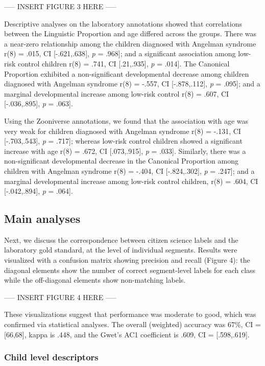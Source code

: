 \documentclass[english,,man]{apa6}
\begin{document}
----- INSERT FIGURE 3 HERE -----

Descriptive analyses on the laboratory annotations showed that correlations between the Linguistic Proportion and age differed across the groups. There was a near-zero relationship among the children diagnosed with Angelman syndrome r(8) = .015, CI {[}-.621,.638{]}, \emph{p} = .968{]}; and a significant association among low-risk control children r(8) = .741, CI {[}.21,.935{]}, \emph{p} = .014{]}. The Canonical Proportion exhibited a non-significant developmental decrease among children diagnosed with Angelman syndrome r(8) = -.557, CI {[}-.878,.112{]}, \emph{p} = .095{]}; and a marginal developmental increase among low-risk control r(8) = .607, CI {[}-.036,.895{]}, \emph{p} = .063{]}.

Using the Zooniverse annotations, we found that the association with age was very weak for children diagnosed with Angelman syndrome r(8) = -.131, CI {[}-.703,.543{]}, \emph{p} = .717{]}; whereas low-risk control children showed a significant increase with age r(8) = .672, CI {[}.073,.915{]}, \emph{p} = .033{]}. Similarly, there was a non-significant developmental decrease in the Canonical Proportion among children with Angelman syndrome r(8) = -.404, CI {[}-.824,.302{]}, \emph{p} = .247{]}; and a marginal developmental increase among low-risk control children, r(8) = .604, CI {[}-.042,.894{]}, \emph{p} = .064{]}.

\hypertarget{main-analyses}{%
\subsection{Main analyses}\label{main-analyses}}

Next, we discuss the correspondence between citizen science labels and the laboratory gold standard, at the level of individual segments. Results were visualized with a confusion matrix showing precision and recall (Figure 4): the diagonal elements show the number of correct segment-level labels for each class while the off-diagonal elements show non-matching labels.

----- INSERT FIGURE 4 HERE -----

These visualizations suggest that performance was moderate to good, which was confirmed via statistical analyses. The overall (weighted) accuracy was 67\%, CI = {[}66,68{]}, kappa is .448, and the Gwet's AC1 coefficient is .609, CI = {[}.598,.619{]}.

\hypertarget{child-level-descriptors}{%
\subsubsection{Child level descriptors}\label{child-level-descriptors}}
\end{document}

